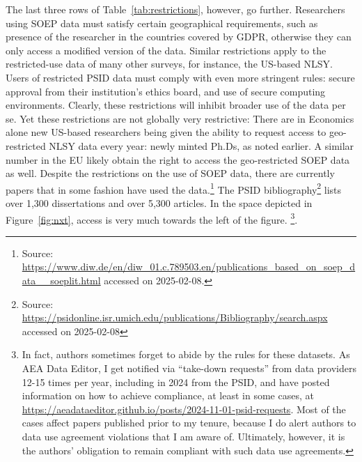 \documentclass{Revue-economique}
\begin{document}
\begin{Article} [%
	Titre={Reproducibility and Open Science in Economics},
	Auteur={Lars Vilhuber\thanks{Cornell University, lars.vilhuber@cornell.edu}}]
\begin{refsection}[Main]
The last three rows of  Table~\ref{tab:restrictions}, however, go further. Researchers using SOEP data must satisfy certain geographical requirements, such as presence of the researcher in the countries covered by \ac{GDPR}, otherwise they can only access a modified version of the data. Similar restrictions apply to the restricted-use data of many other surveys, for instance, the US-based \ac{NLSY}. Users of restricted PSID data must comply with even more stringent rules: secure approval from their institution's ethics board, and use of secure computing environments. Clearly, these restrictions will inhibit broader use of the data per se. Yet these restrictions are not globally very restrictive: There are in Economics alone \economicsgrads{} new US-based researchers being given the ability to request access to geo-restricted NLSY data every year: newly minted Ph.Ds, as noted earlier. A similar number in the EU likely obtain the right to access the geo-restricted SOEP data as well. Despite the restrictions on the use of SOEP data, there are currently \soeppapers{} papers that in some fashion have used the data.\footnote{Source: \url{https://www.diw.de/en/diw_01.c.789503.en/publications_based_on_soep_data__soeplit.html} accessed on 2025-02-08.} 
The PSID bibliography\footnote{Source: \url{https://psidonline.isr.umich.edu/publications/Bibliography/search.aspx} accessed on 2025-02-08} lists over 1,300 dissertations and over 5,300 articles.
In the space depicted in Figure~\ref{fig:nxt}, access is very much towards the left of the figure.%
%
\footnote{In fact, authors sometimes forget to abide by the rules for these datasets. As AEA Data Editor, I get notified via ``take-down requests'' from data providers 12-15 times per year, including in 2024 from the PSID, and have posted information on how to achieve compliance, at least in some cases, at \url{https://aeadataeditor.github.io/posts/2024-11-01-psid-requests}. Most of the cases affect papers published prior to my tenure, because I do alert authors to  data use agreement violations that I am aware of. Ultimately, however, it is the authors' obligation to remain compliant with such data use agreements.}. 


\end{refsection}
\end{Article}
\end{document}
